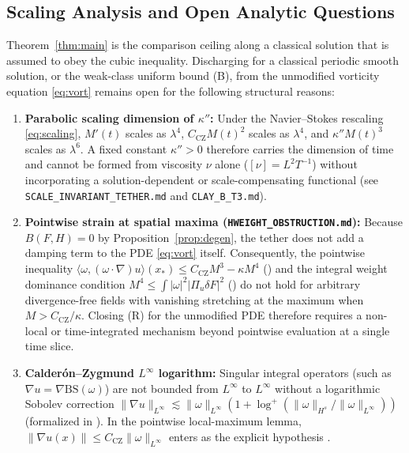 \documentclass[11pt,a4paper]{article}
\theoremstyle{plain}
\theoremstyle{definition}
\theoremstyle{remark}
\newcommand{\CZ}{C_{\mathrm{CZ}}}
\begin{document}
\subsection{Scaling Analysis and Open Analytic Questions}\label{sec:obstruction}\label{sec:open}
Theorem~\ref{thm:main} is the comparison ceiling along a classical solution that is assumed to obey the cubic inequality. Discharging  for a classical periodic smooth solution, or the weak-class uniform bound (B), from the unmodified vorticity equation \eqref{eq:vort} remains open for the following structural reasons:
\begin{enumerate}
\item \textbf{Parabolic scaling dimension of $\kappa''$:} Under the Navier--Stokes rescaling \eqref{eq:scaling}, $M'(t)$ scales as $\lambda^4$, $\CZ M(t)^2$ scales as $\lambda^4$, and $\kappa'' M(t)^3$ scales as $\lambda^6$. A fixed constant $\kappa''>0$ therefore carries the dimension of time and cannot be formed from viscosity $\nu$ alone ($[\nu]=L^2T^{-1}$) without incorporating a solution-dependent or scale-compensating functional (see \texttt{SCALE\_INVARIANT\_TETHER.md} and \texttt{CLAY\_B\_T3.md}).
\item \textbf{Pointwise strain at spatial maxima (\texttt{HWEIGHT\_OBSTRUCTION.md}):} Because $B(F,H)=0$ by Proposition~\ref{prop:degen}, the tether does not add a damping term to the PDE \eqref{eq:vort} itself. Consequently, the pointwise inequality $\langle\omega,(\omega\cdot\nabla)u\rangle(x_*)\le\CZ M^3-\kappa M^4$ () and the integral weight dominance condition $M^4\le\int|\omega|^2|\Pi_u\delta F|^2$ () do not hold for arbitrary divergence-free fields with vanishing stretching at the maximum when $M>\CZ/\kappa$. Closing (R) for the unmodified PDE therefore requires a non-local or time-integrated mechanism beyond pointwise evaluation at a single time slice.
\item \textbf{Calderón--Zygmund $L^\infty$ logarithm:} Singular integral operators (such as $\nabla u=\nabla\mathrm{BS}(\omega)$) are not bounded from $L^\infty$ to $L^\infty$ without a logarithmic Sobolev correction $\|\nabla u\|_{L^\infty}\lesssim \|\omega\|_{L^\infty}(1+\log^+(\|\omega\|_{H^s}/\|\omega\|_{L^\infty}))$ \cite{BKM1984} (formalized in ). In the pointwise local-maximum lemma, $\|\nabla u(x)\|\le\CZ\|\omega\|_{L^\infty}$ enters as the explicit hypothesis .
\end{enumerate}
\end{document}
